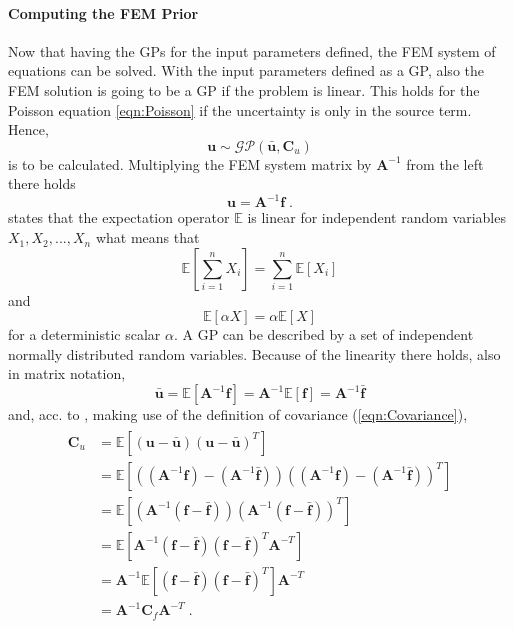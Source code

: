 \documentclass[%
  a4paper,oneside,%
  11pt,%
  smallchapters,
  style=printdev,
  extramargin,
  green,%
  rgb, <cmyk>
  ]{tubsbook}
\begin{document}
\paragraph{Computing the FEM Prior}
Now that having the GPs for the input parameters defined, the FEM system of equations can be solved. With the input parameters defined as a GP, also the FEM solution is going to be a GP if the problem is linear. This holds for the Poisson equation \eqref{eqn:Poisson} if the uncertainty is only in the source term. Hence,
\begin{equation}
\bm{u} \sim \mathcal{GP}(\bar{\bm{u}}, \bm{C}_u)
\label{eqn:SolutionGP}
\end{equation}
is to be calculated. Multiplying the FEM system matrix by $\bm{A}^{-1}$ from the left there holds
\begin{equation}
\bm{u} = \bm{A}^{-1}\bm{f} \;.
\end{equation}
\cite[p. 1428]{arens2015} states that the expectation operator $\mathbb{E}$ is linear for independent random variables $X_1,X_2,...,X_n$ what means that
\begin{equation}
\mathbb{E}\left[  \sum_{i=1}^n X_i \right] = \sum_{i=1}^n \mathbb{E}[X_i] 
\end{equation}
and
\begin{equation}
\mathbb{E}\left[ \alpha X   \right] =\alpha \mathbb{E}\left[  X   \right]
\end{equation}
for a deterministic scalar $\alpha$.
A GP can be described by a set of independent normally distributed random variables. Because of the linearity there holds, also in matrix notation,
\begin{equation}
\bar{\bm{u}} = \mathbb{E}[\bm{A}^{-1} \bm{f}] = \bm{A}^{-1} \mathbb{E}[\bm{f}] = \bm{A}^{-1} \bar{\bm{f}}
\end{equation}
and, acc. to \cite{schon2011, bardsley2018}, making use of the definition of covariance (\ref{eqn:Covariance}),
\begin{align}
\begin{split}
\bm{C}_u &= \mathbb{E}[(\bm{u}-\bar{\bm{u}})(\bm{u}-\bar{\bm{u}})^T] \\
	&= \mathbb{E}\left[\left((\bm{A}^{-1} \bm{f}) - (\bm{A}^{-1} \bar{\bm{f}}) \right) \left( (\bm{A}^{-1} \bm{f}) - (\bm{A}^{-1} \bar{\bm{f}}) \right)^T   \right]\\
	&= \mathbb{E}\left[  \left( \bm{A}^{-1}(\bm{f}-\bar{\bm{f}})   \right)  \left( \bm{A}^{-1}(\bm{f}-\bar{\bm{f}})   \right)^T  \right]\\
	&= \mathbb{E} \left[    \bm{A}^{-1} ( \bm{f} - \bar{\bm{f}} ) ( \bm{f} - \bar{\bm{f}} )^T \bm{A}^{-T}   \right]\\
	&= \bm{A}^{-1}   \mathbb{E}\left[ (\bm{f}-\bar{\bm{f}}) (\bm{f}-\bar{\bm{f}})^T   \right] \bm{A}^{-T} \\
	&= \bm{A}^{-1} \bm{C}_f \bm{A}^{-T}  \;.
\end{split}
\label{eqn:Covarf}
\end{align}
\end{document}
